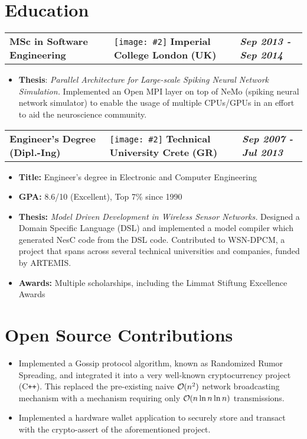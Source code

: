 \documentclass[a4paper,10pt]{article}
\DeclareRobustCommand{\bigO}{%
  \text{\usefont{OMS}{cmsy}{m}{n}O}%
}
\newcommand*{\mahogany}{\textcolor{Mahogany}}
\newcommand{\jobtitle}[5]{
\vspace{0.1cm}
\begin{tabularx}
{\textwidth}
{ >{\raggedright\arraybackslash}p{6cm} 
  >{\raggedright\arraybackslash}X 
  >{\raggedleft\arraybackslash}p{4cm} }
\large\textbf{#1} & 
\texttt{[image: \#2]} \large\textbf{\mahogany{#3}} \normalsize\textbf{(#4)} & 
\textit{\large\textbf{#5}}
\end{tabularx}
\vspace{-0.4cm}
}
\begin{document}
\section{Education}
\jobtitle{MSc in Software Engineering}{icons/icl.png}{Imperial College London}{UK}{Sep 2013 - Sep 2014}
\begin{itemize}[leftmargin=.27in,label=] \setlength\itemsep{0cm}
\item \normalsize \textbf{Thesis}: \textit{Parallel Architecture for Large-scale Spiking Neural Network Simulation.} Implemented an Open MPI layer on top of NeMo (spiking neural network simulator) to enable the usage of multiple CPUs/GPUs in an effort to aid the neuroscience community.

\end{itemize}

\vspace{0.2cm}
\jobtitle{Engineer's Degree (Dipl.-Ing)}{icons/tuc.png}{Technical University Crete}{GR}{Sep 2007 - Jul 2013}
\begin{itemize}[leftmargin=.27in,label=]\setlength\itemsep{-0.1cm}
\item \textbf{Title:} Engineer's degree in Electronic and Computer Engineering

\item\textbf{GPA:} 8.6/10 (Excellent), Top 7\% since 1990

\item \textbf{Thesis:} \textit{Model Driven Development in Wireless Sensor Networks.}  Designed a Domain Specific Language (DSL) and implemented a model compiler which generated NesC code from the DSL code. Contributed to WSN-DPCM, a project that spans across several technical universities and companies, funded by ARTEMIS.

\item \textbf{Awards:} Multiple scholarships, including the Limmat Stiftung Excellence Awards

\end{itemize}	

\section{Open Source Contributions}
\vspace{0.2cm}
\begin{itemize}[leftmargin=.27in,label=] 
\setlength\itemsep{-0.1cm}
\item Implemented a Gossip protocol algorithm, known as Randomized Rumor Spreading, and integrated it into a very well-known cryptocurrency project \textsc{(C\texttt{++})}. This replaced the pre-existing naive $\bigO(n^2)$ network broadcasting mechanism with a mechanism requiring only $\bigO(n\ln n\ln n)$ transmissions.
\item Implemented a hardware wallet application to securely store and transact with the crypto-assert of the aforementioned project. 
\end{itemize}
\end{document}
